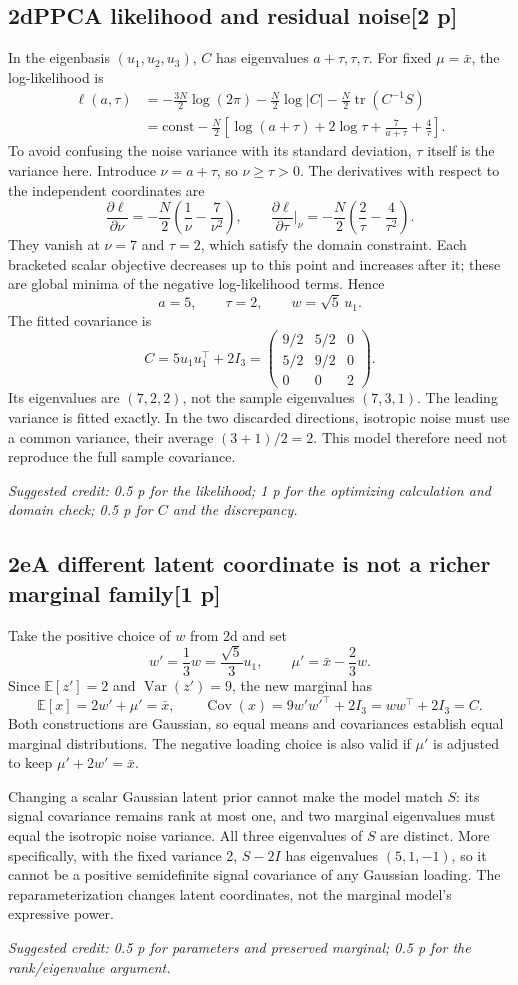 \documentclass[11pt,a4paper]{article}
\newcommand{\E}{\mathbb E}
\DeclareMathOperator{\Cov}{Cov}
\DeclareMathOperator{\Var}{Var}
\DeclareMathOperator{\tr}{tr}
\newcommand{\solution}[3]{\Needspace{6\baselineskip}\subsection*{\color{examblue}#1\quad #2\hfill\normalsize[#3 p]}}
\newcommand{\selfcredit}[1]{\par\textit{Suggested credit: #1}\par}
\begin{document}
\solution{2d}{PPCA likelihood and residual noise}{2}
In the eigenbasis $(u_1,u_2,u_3)$, $C$ has eigenvalues $a+\tau,\tau,\tau$.
For fixed $\mu=\bar x$, the log-likelihood is
\begin{align*}
\ell(a,\tau)
&=-\frac{3N}{2}\log(2\pi)-\frac N2\log|C|
-\frac N2\tr(C^{-1}S)\\
&=\mathrm{const}-\frac N2\left[
\log(a+\tau)+2\log\tau+\frac7{a+\tau}+\frac4\tau\right].
\end{align*}
To avoid confusing the noise variance with its standard deviation, $\tau$
itself is the variance here. Introduce $\nu=a+\tau$, so $\nu\geq\tau>0$.
The derivatives with respect to the independent coordinates are
\[
\frac{\partial\ell}{\partial\nu}
=-\frac N2\left(\frac1\nu-\frac7{\nu^2}\right),\qquad
\frac{\partial\ell}{\partial\tau}\bigg|_\nu
=-\frac N2\left(\frac2\tau-\frac4{\tau^2}\right).
\]
They vanish at $\nu=7$ and $\tau=2$, which satisfy the domain constraint.
Each bracketed scalar objective decreases up to this point and increases after
it; these are global minima of the negative log-likelihood terms. Hence
\[
\boxed{a=5,\qquad \tau=2,\qquad w=\sqrt5\,u_1}.
\]
The fitted covariance is
\[
\boxed{C=5u_1u_1^\top+2I_3
=\begin{pmatrix}9/2&5/2&0\\5/2&9/2&0\\0&0&2\end{pmatrix}}.
\]
Its eigenvalues are $(7,2,2)$, not the sample eigenvalues $(7,3,1)$.
The leading variance is fitted exactly. In the two discarded directions,
isotropic noise must use a common variance, their average $(3+1)/2=2$.
This model therefore need not reproduce the full sample covariance.
\selfcredit{0.5 p for the likelihood; 1 p for the optimizing calculation and domain check; 0.5 p for $C$ and the discrepancy.}

\solution{2e}{A different latent coordinate is not a richer marginal family}{1}
Take the positive choice of $w$ from 2d and set
\[
\boxed{w'=\frac13w=\frac{\sqrt5}{3}u_1,\qquad
\mu'=\bar x-\frac23w}.
\]
Since $\E[z']=2$ and $\Var(z')=9$, the new marginal has
\[
\E[x]=2w'+\mu'=\bar x,\qquad
\Cov(x)=9w'w'^\top+2I_3=ww^\top+2I_3=C.
\]
Both constructions are Gaussian, so equal means and covariances establish
equal marginal distributions. The negative loading choice is also valid if
$\mu'$ is adjusted to keep $\mu'+2w'=\bar x$.

Changing a scalar Gaussian latent prior cannot make the model match $S$:
its signal covariance remains rank at most one, and two marginal eigenvalues
must equal the isotropic noise variance. All three eigenvalues of $S$ are
distinct. More specifically, with the fixed variance 2,
$S-2I$ has eigenvalues $(5,1,-1)$, so it cannot be a positive semidefinite
signal covariance of any Gaussian loading. The reparameterization changes
latent coordinates, not the marginal model's expressive power.
\selfcredit{0.5 p for parameters and preserved marginal; 0.5 p for the rank/eigenvalue argument.}
\end{document}
